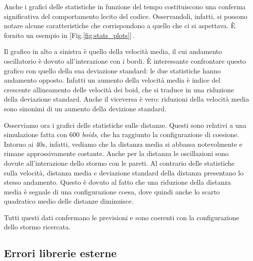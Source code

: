 \documentclass{article}
\begin{document}
Anche i grafici delle statistiche in funzione del tempo costituiscono una 
conferma significativa del comportamento lecito del codice. Osservandoli, 
infatti, si possono notare alcune caratteristiche che corrispondono a quello che
ci si aspettava. È fornito un esempio in [Fig.\ref{fig:stats_plots}]\,.

Il grafico in alto a sinistra è quello della velocità media, il cui andamento 
oscillatorio è dovuto all'interazione con i bordi. \`E interessante confrontare 
questo grafico con quello della sua deviazione standard: le due statistiche 
hanno andamento opposto. Infatti un aumento della velocità media è indice del 
crescente allineamento delle velocità dei boid, che si traduce in una riduzione 
della deviazione standard. Anche il viceversa è vero: riduzioni della  velocità 
media sono sinonimi di un aumento della devizione standard. 

Osserviamo ora i grafici delle statistiche sulle distanze. Questi sono relativi 
a una simulazione fatta con 600 \textit{boids}, che ha raggiunto la 
configurazione di coesione. Intorno ai 40s, infatti, vediamo che la distanza 
media si abbassa notevolmente e rimane approssivamente costante. Anche per la 
distanza le oscillazioni sono dovute all'interazione dello stormo con le pareti.
 Al contrario delle statistiche sulla velocità, distanza media e deviazione 
 standard della distanza presentano lo stesso andamento. Questo è dovuto al 
 fatto che una riduzione della distanza media è segnale di una configurazione 
 coesa, dove quindi anche lo scarto quadratico medio delle distanze diminuisce.

Tutti questi dati confermano le previsioni e sono coerenti con la configurazione
 dello stormo ricercata. 

\subsection{Errori librerie esterne}
\end{document}
